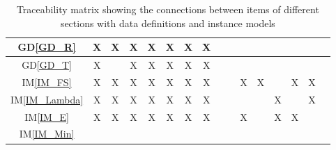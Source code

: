\documentclass[12pt]{article}
\newcommand{\iref}[1]{IM\ref{#1}}
\newcommand{\dref}[1]{GD\ref{#1}}
\begin{document}
{\begin{landscape}
\begin{table}[h!]
\begin{tabular}{|c|c|c|c|c|c|c|c|c|c|c|c|c|c|c|c|}
\dref{GD_R}            & X& X& X& X& X& X& X& & & & & & & & \\ 
\hline
\dref{GD_T}            & X& & X& X& X& X& X& & & & & & & & \\ 
\hline
\iref{IM_FS}            & X& X& X& X& X& X& X& & & X& X& & X& X& \\ 
\hline
\iref{IM_Lambda}        & X& X& X& X& X& X& X& & & & & X& & X& \\ 
\hline
\iref{IM_E}             & X& X& X& X& X& X& X& & & X& & X& X& & \\ 
\hline
\iref{IM_Min}           & & & & & & & & & & & & & & & \\
\hline
\end{tabular}
\caption{Traceability matrix showing the connections between items of different 
	sections with data definitions and instance models}
\label{Table:trace2}
\end{table}
\end{landscape}
}
\end{document}
